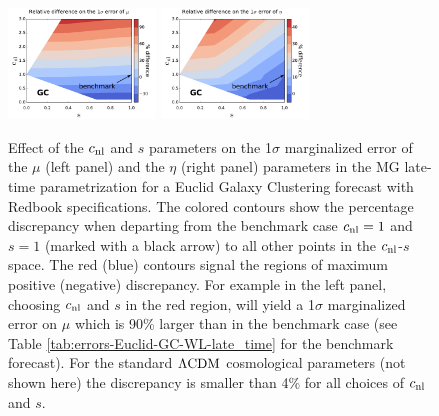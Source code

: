 \begin{figure}[htbp]
\centering{}
\includegraphics[width=0.35\textwidth]{Chapters/linear-nonlinear-MG-forecasts/figures/DensityPlots/GC-Zhao-effect-mu.pdf}
\includegraphics[width=0.35\textwidth]{Chapters/linear-nonlinear-MG-forecasts/figures/DensityPlots/GC-Zhao-effect-eta.pdf}
\caption[Effect of the HS non-linear prescription on parameter estimation for GC in MG.]{\label{fig:Density-GC-HSpars}Effect
of the $c_{\mathrm{nl}}$ and $s$ parameters
on the 1$\sigma$ marginalized error of the $\mu$ (left panel) and the
$\eta$ (right panel) parameters
in the MG late-time parametrization for a Euclid Galaxy Clustering
forecast with Redbook specifications. The colored contours show the percentage discrepancy when
departing from the benchmark case $c_{\mathrm{nl}}=1$ and $s=1$ (marked with
a black arrow) to all other points in the $c_{\mathrm{nl}}$-$s$
space. The red (blue) contours signal the regions of maximum positive (negative) discrepancy.
For example in the left panel, choosing $c_{\mathrm{nl}}$ and $s$ in the
red region, will yield a 1$\sigma$ marginalized error on $\mu$
which is 90\% larger than in the benchmark case (see Table
\ref{tab:errors-Euclid-GC-WL-late_time}
for the benchmark forecast). For the standard $\Lambda\mathrm{CDM}$ cosmological
parameters (not shown here) the discrepancy is smaller than 4\% for all choices of $c_{\mathrm{nl}}$ and $s$.
}
\end{figure}


